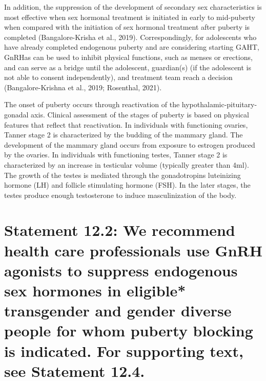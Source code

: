 \documentclass[
]{book}
\begin{document}
In addition, the suppression of the development of secondary sex characteristics is most
effective when sex hormonal treatment is initiated
in early to mid-puberty when compared with the
initiation of sex hormonal treatment after puberty
is completed (Bangalore-Krisha et al., 2019).
Correspondingly, for adolescents who have already
completed endogenous puberty and are considering starting GAHT, GnRHas can be used to
inhibit physical functions, such as menses or
erections, and can serve as a bridge until the
adolescent, guardian(s) (if the adolescent is not
able to consent independently), and treatment
team reach a decision (Bangalore-Krishna et al.,
2019; Rosenthal, 2021).

The onset of puberty occurs through reactivation of the hypothalamic-pituitary-gonadal axis.
Clinical assessment of the stages of puberty is
based on physical features that reflect that reactivation. In individuals with functioning ovaries,
Tanner stage 2 is characterized by the budding of
the mammary gland. The development of the
mammary gland occurs from exposure to estrogen
produced by the ovaries. In individuals with functioning testes, Tanner stage 2 is characterized by
an increase in testicular volume (typically greater
than 4ml). The growth of the testes is mediated
through the gonadotropins luteinizing hormone
(LH) and follicle stimulating hormone (FSH). In
the later stages, the testes produce enough testosterone to induce masculinization of the body.

\hypertarget{statement-12.2-we-recommend-health-care-professionals-use-gnrh-agonists-to-suppress-endogenous-sex-hormones-in-eligible-transgender-and-gender-diverse-people-for-whom-puberty-blocking-is-indicated.-for-supporting-text-see-statement-12.4.}{%
\section*{Statement 12.2: We recommend health care professionals use GnRH agonists to suppress endogenous sex hormones in eligible* transgender and gender diverse people for whom puberty blocking is indicated. For supporting text, see Statement 12.4.}\label{statement-12.2-we-recommend-health-care-professionals-use-gnrh-agonists-to-suppress-endogenous-sex-hormones-in-eligible-transgender-and-gender-diverse-people-for-whom-puberty-blocking-is-indicated.-for-supporting-text-see-statement-12.4.}}
\end{document}
